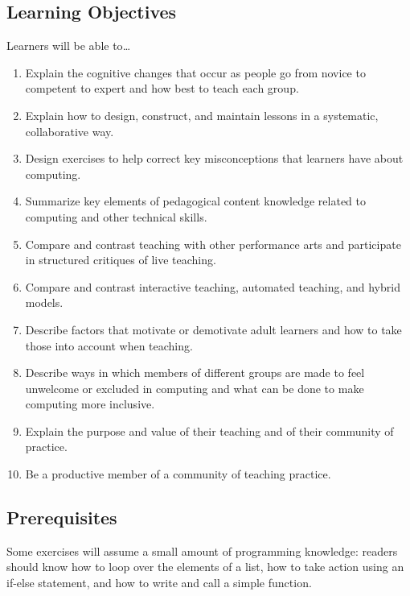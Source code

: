 \subsection*{Learning Objectives}

Learners will be able to{\ldots}

\begin{enumerate}
\item
  Explain the cognitive changes that occur as people go from novice to
  competent to expert and how best to teach each group.
\item
  Explain how to design, construct, and maintain lessons in a
  systematic, collaborative way.
\item
  Design exercises to help correct key misconceptions that learners
  have about computing.
\item
  Summarize key elements of pedagogical content knowledge related to
  computing and other technical skills.
\item
  Compare and contrast teaching with other performance arts and
  participate in structured critiques of live teaching.
\item
  Compare and contrast interactive teaching, automated teaching, and
  hybrid models.
\item
  Describe factors that motivate or demotivate adult learners and how
  to take those into account when teaching.
\item
  Describe ways in which members of different groups are made to feel
  unwelcome or excluded in computing and what can be done to make
  computing more inclusive.
\item
  Explain the purpose and value of their teaching and of their
  community of practice.
\item
  Be a productive member of a community of teaching practice.
\end{enumerate}

\subsection*{Prerequisites}

Some exercises will assume a small amount of programming knowledge:
readers should know how to loop over the elements of a list, how to take
action using an if-else statement, and how to write and call a simple
function.
